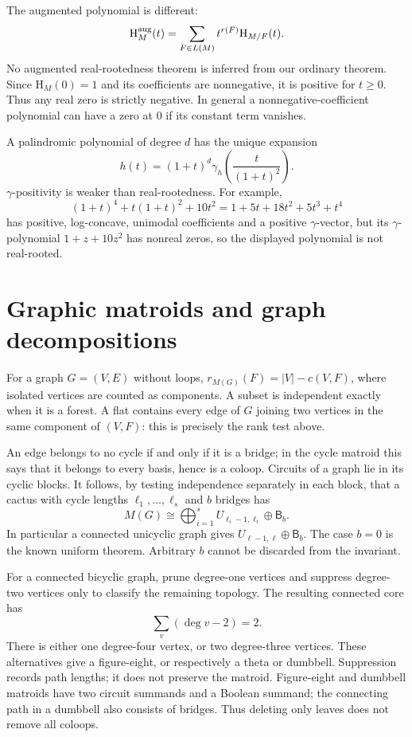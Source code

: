\documentclass[12pt]{amsart}
\theoremstyle{definition}
\theoremstyle{remark}
\numberwithin{equation}{section}
\newcommand{\HCh}{\mathrm{H}}
\newcommand{\Bmat}{\mathsf{B}}
\begin{document}
The augmented polynomial is different:
\[
 \HCh_M^{\rm aug}(t)=\sum_{F\in L(M)}t^{r(F)}\HCh_{M/F}(t).
\]
No augmented real-rootedness theorem is inferred from our ordinary theorem. Since $\HCh_M(0)=1$ and its coefficients are nonnegative, it is positive for $t\geq0$. Thus any real zero is strictly negative. In general a nonnegative-coefficient polynomial can have a zero at $0$ if its constant term vanishes.

A palindromic polynomial of degree $d$ has the unique expansion
\[
 h(t)=(1+t)^d\gamma_h\!\left(\frac{t}{(1+t)^2}\right).
\]
$\gamma$-positivity is weaker than real-rootedness. For example,
\[
 (1+t)^4+t(1+t)^2+10t^2=1+5t+18t^2+5t^3+t^4
\]
has positive, log-concave, unimodal coefficients and a positive $\gamma$-vector, but its $\gamma$-polynomial $1+z+10z^2$ has nonreal zeros, so the displayed polynomial is not real-rooted.

\section{Graphic matroids and graph decompositions}
For a graph $G=(V,E)$ without loops, $r_{M(G)}(F)=|V|-c(V,F)$, where isolated vertices are counted as components. A subset is independent exactly when it is a forest. A flat contains every edge of $G$ joining two vertices in the same component of $(V,F)$: this is precisely the rank test above.

An edge belongs to no cycle if and only if it is a bridge; in the cycle matroid this says that it belongs to every basis, hence is a coloop. Circuits of a graph lie in its cyclic blocks. It follows, by testing independence separately in each block, that a cactus with cycle lengths $\ell_1,\ldots,\ell_s$ and $b$ bridges has
\begin{equation}\label{en-cactus-matroid}
 M(G)\cong\bigoplus_{i=1}^sU_{\ell_i-1,\ell_i}\oplus\Bmat_b.
\end{equation}
In particular a connected unicyclic graph gives $U_{\ell-1,\ell}\oplus\Bmat_b$. The case $b=0$ is the known uniform theorem. Arbitrary $b$ cannot be discarded from the invariant.

For a connected bicyclic graph, prune degree-one vertices and suppress degree-two vertices only to classify the remaining topology. The resulting connected core has
\[
 \sum_v(\deg v-2)=2.
\]
There is either one degree-four vertex, or two degree-three vertices. These alternatives give a figure-eight, or respectively a theta or dumbbell. Suppression records path lengths; it does not preserve the matroid. Figure-eight and dumbbell matroids have two circuit summands and a Boolean summand; the connecting path in a dumbbell also consists of bridges. Thus deleting only leaves does not remove all coloops.
\end{document}
